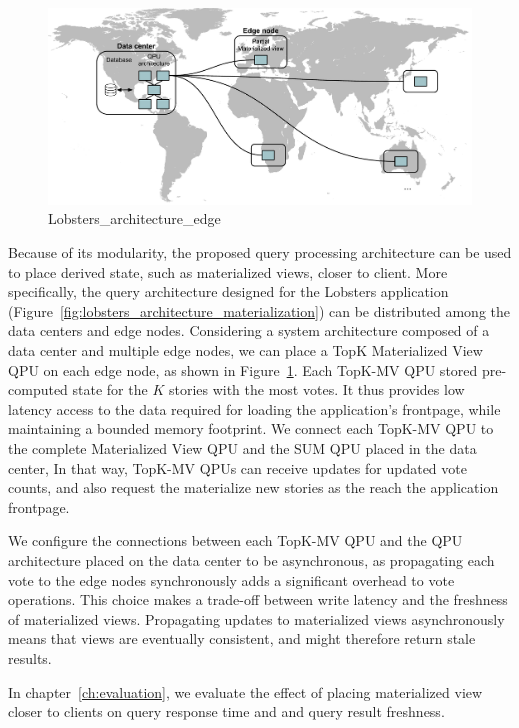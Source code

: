 \begin{figure}[t]
  \centering
    \includegraphics[scale=0.4]{./figures/case_studies/lobsters_architecture_edge.pdf}
  \caption{Lobsters\_architecture\_edge}
  \label{fig:lobsters_architecture_edge}
\end{figure}

\medskip
\noindent
Because of its modularity, the proposed query processing architecture can be used to place derived state, such as materialized views,
closer to client.
More specifically,
the query architecture designed for the Lobsters application (Figure~\ref{fig:lobsters_architecture_materialization}) can be
distributed among the data centers and edge nodes.
Considering a system architecture composed of a data center and multiple edge nodes,
we can place a TopK Materialized View QPU on each edge node, as shown in Figure~\ref{fig:lobsters_architecture_edge}.
Each TopK-MV QPU stored pre-computed state for the $K$ stories with the most votes.
It thus provides low latency access to the data required for loading the application's frontpage,
while maintaining a bounded memory footprint.
We connect each TopK-MV QPU to the complete Materialized View QPU and the SUM QPU placed in the data center,
In that way, TopK-MV QPUs can receive updates for updated vote counts,
and also request the materialize new stories as the reach the application frontpage.

We configure the connections between each TopK-MV QPU and the QPU architecture placed on the data center to be asynchronous,
as propagating each vote to the edge nodes synchronously adds a significant overhead to vote operations.
This choice makes a trade-off between write latency and the freshness of materialized views.
Propagating updates to materialized views asynchronously means that views are eventually consistent,
and might therefore return stale results.

In chapter~\ref{ch:evaluation}, we evaluate the effect of placing materialized view closer to clients on query response time and
and query result freshness.

